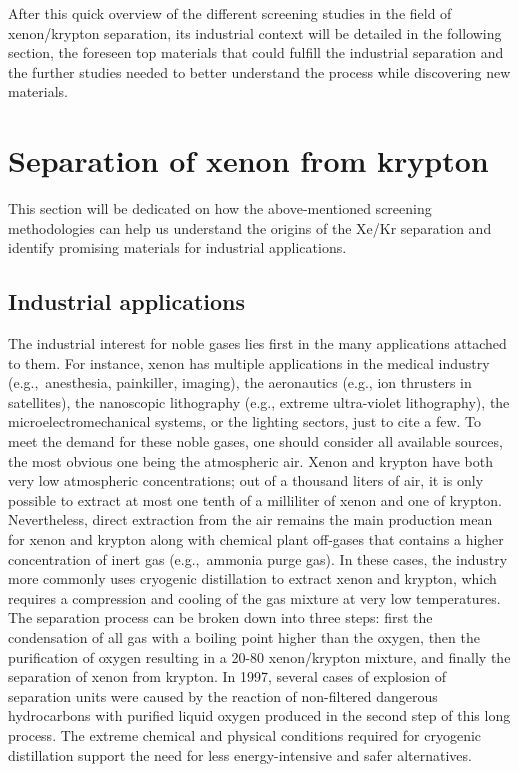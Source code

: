 \documentclass[main.tex]{subfiles}
\begin{document}
After this quick overview of the different screening studies in the field of xenon/krypton separation, its industrial context will be detailed in the following section, the foreseen top materials that could fulfill the industrial separation and the further studies needed to better understand the process while discovering new materials.


\section{Separation of xenon from krypton}

This section will be dedicated on how the above-mentioned screening methodologies can help us understand the origins of the Xe/Kr separation and identify promising materials for industrial applications. 

\subsection{Industrial applications}\label{sct:industrial}

The industrial interest for noble gases lies first in the many applications attached to them. For instance, xenon has multiple applications in the medical industry (e.g.,\ anesthesia, painkiller, imaging),\autocite{cullen1951anesthetic, holstrater2011intranasal,Mammarappallil_2019} the aeronautics (e.g., ion thrusters in satellites),\autocite{Patterson_2002,Coxhill_2005} the nanoscopic lithography (e.g., extreme ultra-violet lithography),\autocite{Abramov_2018} the microelectromechanical systems,\autocite{Chang_1995} or the lighting sectors,\autocite{Jarman_1974,Tanaka_2019} just to cite a few. To meet the demand for these noble gases, one should consider all available sources, the most obvious one being the atmospheric air. Xenon and krypton have both very low atmospheric concentrations; out of a thousand liters of air, it is only possible to extract at most one tenth of a milliliter of xenon and one of krypton.\autocite{kerry2007industrial} Nevertheless, direct extraction from the air remains the main production mean for xenon and krypton along with chemical plant off-gases that contains a higher concentration of inert gas (e.g.,\ ammonia purge gas). In these cases, the industry more commonly uses cryogenic distillation to extract xenon and krypton, which requires a compression and cooling of the gas mixture at very low temperatures. The separation process can be broken down into three steps: first the condensation of all gas with a boiling point higher than the oxygen, then the purification of oxygen resulting in a 20-80 xenon/krypton mixture, and finally the separation of xenon from krypton. In 1997, several cases of explosion of separation units were caused by the reaction of non-filtered dangerous hydrocarbons with purified liquid oxygen produced in the second step of this long process.\autocite{distill_accident,distill_accident2} The extreme chemical and physical conditions required for cryogenic distillation support the need for less energy-intensive and safer alternatives. 
\end{document}
